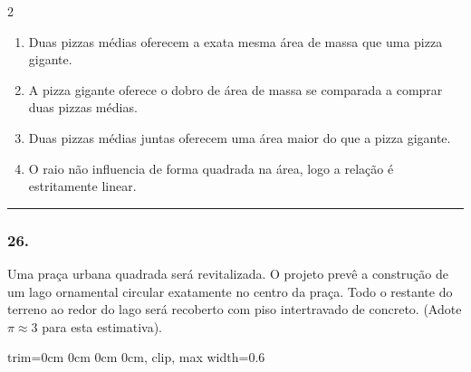 \documentclass[twoside, 10pt, a4paper]{article}
\newlength{\espacoPreQuestao}\setlength{\espacoPreQuestao}{0.1cm}
\newlength{\espacoQuestao}\setlength{\espacoQuestao}{0.2cm}
\newlength{\espacoAlt}\setlength{\espacoAlt}{0.2cm}
\begin{document}
\begin{multicols*}{2}
\begin{enumerate}[label=\alph*), itemsep=\espacoAlt]
\item Duas pizzas médias oferecem a exata mesma área de massa que uma pizza gigante.
\item A pizza gigante oferece o dobro de área de massa se comparada a comprar duas pizzas médias.
\item Duas pizzas médias juntas oferecem uma área maior do que a pizza gigante.
\item O raio não influencia de forma quadrada na área, logo a relação é estritamente linear.
\end{enumerate}
\par\vspace{\espacoQuestao}
\noindent\textcolor{CorLinha}{\rule{\linewidth}{0.5pt}} 
\par\vspace{\espacoPreQuestao}
\subsubsection*{26.} Uma praça urbana quadrada será revitalizada. O projeto prevê a construção de um lago ornamental circular exatamente no centro da praça. Todo o restante do terreno ao redor do lago será recoberto com piso intertravado de concreto. (Adote $ \pi \approx 3 $ para esta estimativa).

\begin{center}
\begin{adjustbox}{trim=0cm 0cm 0cm 0cm, clip, max width=0.6\linewidth}
\end{adjustbox}
\end{center}


\end{multicols*}
\end{document}
